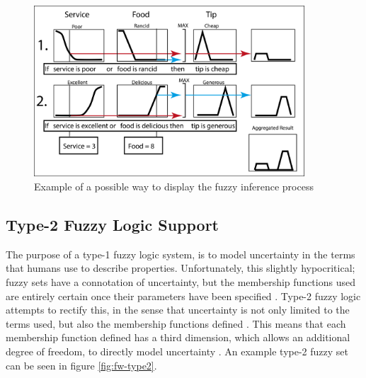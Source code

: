 \begin{figure}[ht!]
	\begin{center}
		\includegraphics[width=0.9\textwidth]{images/inference}
	\end{center}
	\vspace{-2mm}
	\caption{Example of a possible way to display the fuzzy inference process}
	\label{fig:fw-inf}
	\vspace{-1mm}
\end{figure}

\subsection{Type-2 Fuzzy Logic Support}
\label{sec:type2}
The purpose of a type-1 fuzzy logic system, is to model uncertainty in the terms that humans use to describe properties. Unfortunately, this slightly hypocritical; fuzzy sets have a connotation of uncertainty, but the membership functions used are entirely certain once their parameters have been specified \cite{mendel2003type}. Type-2 fuzzy logic attempts to rectify this, in the sense that uncertainty is not only limited to the terms used, but also the membership functions defined \cite{castillo2003type}. This means that each membership function defined has a third dimension, which allows an additional degree of freedom, to directly model uncertainty \cite{mendel2002type}. An example type-2 fuzzy set can be seen in figure \ref{fig:fw-type2}.

